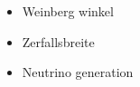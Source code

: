 
\begin{frame}

\begin{itemize}
	\item	Weinberg winkel
	\item Zerfallsbreite 
	\item Neutrino generation
\end{itemize}

\end{frame}